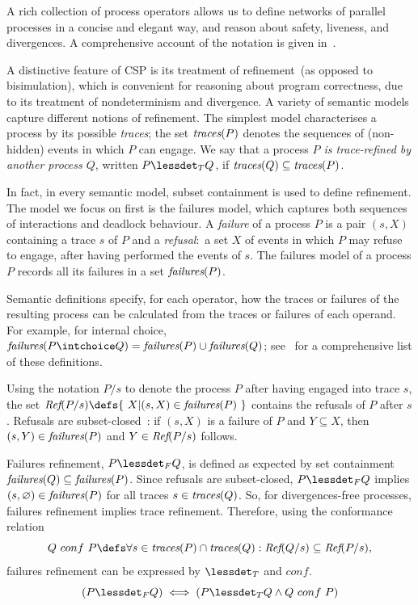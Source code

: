 A rich collection of process operators allows us to define networks of
parallel processes in a concise and elegant way, and reason about safety,
liveness, and divergences.  A comprehensive account of the notation is given
in~\cite{Roscoe2010}.

A distinctive feature of CSP is its treatment of refinement~(as opposed to
bisimulation), which is convenient for reasoning about program correctness,
due to its treatment of nondeterminism and divergence.  A variety of semantic
models capture different notions of refinement. The simplest model
characterises a process by its possible \emph{traces}; the set $\text{\it traces}(P)$
denotes the sequences of (non-hidden) events in which $P$ can engage.  We say
that a process \emph{$P$ is trace-refined by another process $Q$}, written $P
\lessdet_T Q$, if $\text{\it traces}(Q)\subseteq \text{\it traces}(P)$.

In fact, in every semantic model, subset containment is used to define refinement. The
model we focus on first is the failures model, which captures both
sequences of interactions and deadlock behaviour. A \emph{failure} of a process $P$
is a pair $(s,X)$ containing a trace $s$ of $P$ and a \emph{refusal}:~a set $X$ of
events in which $P$ may refuse to engage, after having performed the events of
$s$. The failures model of a process $P$ records all its failures in a set
$\text{\it failures}(P)$.

Semantic definitions specify, for each operator, how the traces or failures
of the resulting process can be calculated from the traces or failures of
each operand. For example, for internal choice, $\fails(P\intchoice Q) =
\fails(P)\cup\fails(Q)$; see~\cite[p.~210]{Roscoe:1997:TPC:550448} for a
comprehensive list of these definitions.

Using the notation $P/s$ to denote the process $P$ after having engaged into
trace $s$, the set $\refs(P/s) \defs \{~X | (s,X) \in \fails(P)~\}$ contains
the  refusals of $P$ after $s$. Refusals are
subset-closed~\cite{Hoare:1985:CSP:3921,Roscoe2010}: if $(s,X)$ is a failure
of $P$ and $Y\subseteq X$, then $(s,Y)\in\text{\it failures}(P)$ and $Y\in\text{\it Ref}(P/s)$
follows.

Failures refinement, $P \lessdet_F Q$, is defined as expected by set
containment $\text{\it failures}(Q)\subseteq\text{\it failures}(P)$. Since refusals are subset-closed,
$P \lessdet_F Q$ implies
$(s,\varnothing)\in\text{\it failures}(P)$ for all traces $s\in\text{\it traces}(Q)$. So, for
divergences-free processes, failures refinement implies trace refinement.
Therefore, using the conformance relation
%
\begin{equation}\label{eq:conf}
  Q\ conf\ P \defs \forall s\in \trc(P) \cap \trc(Q): \refs(Q/s)
  \subseteq \refs(P/s),
\end{equation}
%
failures refinement can be expressed by $\lessdet_T$ and $conf$.
%
\begin{equation}\label{thm:fref-tref-conf}
(P \lessdet_F Q) \iff (P \lessdet_T Q \land Q\ conf\ P)
\end{equation}
%

